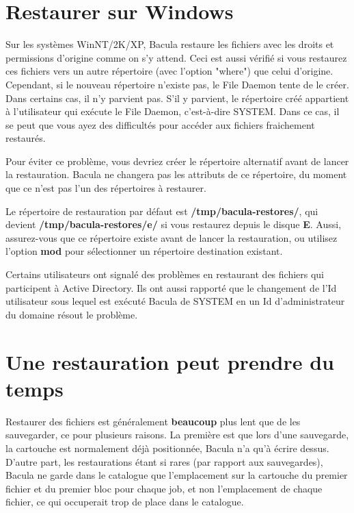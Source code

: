 \label{Windows}

\section{Restaurer sur Windows}
Sur les syst\`emes WinNT/2K/XP, Bacula restaure les fichiers avec les droits 
et permissions d'origine comme on s'y attend. Ceci est aussi v\'erifi\'e si vous 
restaurez ces fichiers vers un autre r\'epertoire (avec l'option "where") que celui 
d'origine. Cependant, si le nouveau r\'epertoire n'existe pas, le File Daemon 
tente de le cr\'eer. Dans certains cas, il n'y parvient pas. S'il y parvient, le 
r\'epertoire cr\'e\'e appartient \`a l'utilisateur qui ex\'ecute le File Daemon, c'est-\`a-dire 
SYSTEM. Dans ce cas, il se peut que vous ayez des difficult\'es pour acc\'eder aux 
fichiers fraichement restaur\'es.

Pour \'eviter ce probl\`eme, vous devriez cr\'eer le r\'epertoire alternatif avant 
de lancer la restauration. Bacula ne changera pas les attributs de ce r\'epertoire, 
du moment que ce n'est pas l'un des r\'epertoires \`a restaurer.

Le r\'epertoire de restauration par d\'efaut est {\bf /tmp/bacula-restores/}, qui devient  
{\bf /tmp/bacula-restores/e/} si vous restaurez depuis le disque {\bf E}. 
Aussi, assurez-vous que ce r\'epertoire existe avant de lancer la restauration, ou 
utilisez l'option {\bf mod} pour s\'electionner un r\'epertoire destination existant.

Certains utilisateurs ont signal\'e des probl\`emes en restaurant des fichiers 
qui participent \`a Active Directory. Ils ont aussi rapport\'e que le changement de 
l'Id utilisateur sous lequel est ex\'ecut\'e Bacula de SYSTEM en un Id d'administrateur 
du domaine r\'esout le probl\`eme.

\section{Une restauration peut prendre du temps}

Restaurer des fichiers est g\'en\'eralement {\bf beaucoup} plus lent que de les 
sauvegarder, ce pour plusieurs raisons. La premi\`ere est que lors d'une sauvegarde, 
la cartouche est normalement d\'ej\`a positionn\'ee, Bacula n'a qu'\`a \'ecrire dessus. 
D'autre part, les restaurations \'etant si rares (par rapport aux sauvegardes), 
Bacula ne garde dans le catalogue que l'emplacement sur la cartouche du premier 
fichier et du premier bloc pour chaque job, et non l'emplacement de chaque fichier, 
ce qui occuperait trop de place dans le catalogue.

